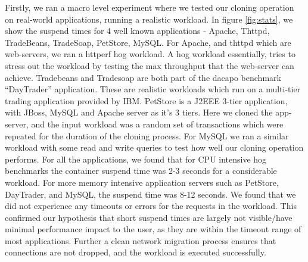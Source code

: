 Firstly, we ran a macro level experiment where we tested our cloning operation on real-world applications, running a realistic workload.
In figure \ref{fig:stats}, we show the suspend times for 4 well known applications - Apache, Thttpd, TradeBeans, TradeSoap, PetStore, MySQL. 
For Apache, and thttpd which are web-servers, we ran a httperf hog workload. A hog workload essentially, tries to stress out the workload by testing the max throughput that the web-server can achieve.
Tradebeans and Tradesoap are both part of the dacapo \cite{dacapo} benchmark ``DayTrader'' application.
These are realistic workloads which run on a multi-tier trading application provided by IBM. 
PetStore is a J2EEE 3-tier application, with JBoss, MySQL and Apache server as it's 3 tiers.
Here we cloned the app-server, and the input workload was a random set of transactions which were repeated for the duration of the cloning process.
For MySQL we ran a similar workload with some read and write queries to test how well our cloning operation performs.
For all the applications, we found that for CPU intensive hog benchmarks the container suspend time was 2-3 seconds for a considerable workload.
For more memory intensive application servers such as PetStore, DayTrader, and MySQL, the suspend time was 8-12 seconds.
We found that we did not experience any timeouts or errors for the requests in the workload. 
This confirmed our hypothesis that short suspend times are largely not visible/have minimal performance impact to the user, as they are within the timeout range of most applications.
Further a clean network migration process ensures that connections are not dropped, and the workload is executed successfully.

